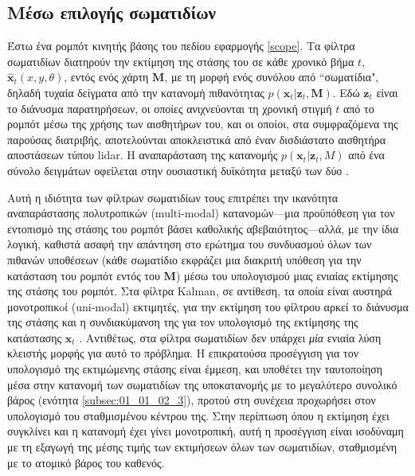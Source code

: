 \subsection{Μέσω επιλογής σωματιδίων}
\label{subsection:02_02_03:01}

Έστω ένα ρομπότ κινητής βάσης του πεδίου εφαρμογής \ref{scope}. Τα φίλτρα
σωματιδίων διατηρούν την εκτίμηση της στάσης του σε κάθε χρονικό βήμα
$t$, $\hat{\bm{x}}_t (x, y, \theta)$, εντός ενός χάρτη $\bm{M}$, με τη μορφή
ενός συνόλου από ``σωματίδια", δηλαδή τυχαία δείγματα από την κατανομή
πιθανότητας $p(\bm{x}_t | \bm{z}_t, \bm{M})$. Εδώ $\bm{z}_t$ είναι το διάνυσμα
παρατηρήσεων, οι οποίες ανιχνεύονται τη χρονική στιγμή $t$ από το ρομπότ μέσω
της χρήσης των αισθητήρων του, και οι οποίοι, στα συμφραζόμενα της παρούσας
διατριβής, αποτελούνται αποκλειστικά από έναν δισδιάστατο αισθητήρα αποστάσεων
τύπου lidar. H αναπαράσταση της κατανομής $p(\bm{x}_t | \bm{z}_t, M)$ από ένα
σύνολο δειγμάτων οφείλεται στην ουσιαστική δυϊκότητα μεταξύ των δύο
\cite{Smith1992}.

Αυτή η ιδιότητα των φίλτρων σωματιδίων τους επιτρέπει την ικανότητα
αναπαράστασης πολυτροπικών (multi-modal) κατανομών---μια προϋπόθεση για τον
εντοπισμό της στάσης του ρομπότ βάσει καθολικής αβεβαιότητος---αλλά, με την
ίδια λογική, καθιστά ασαφή την απάντηση στο ερώτημα του συνδυασμού όλων των
πιθανών υποθέσεων (κάθε σωματίδιο εκφράζει μια διακριτή υπόθεση για την
κατάσταση του ρομπότ εντός του $\bm{M}$) μέσω του υπολογισμού μιας ενιαίας
εκτίμησης της στάσης του ρομπότ. Στα φίλτρα Kalman, σε αντίθεση, τα οποία είναι
αυστηρά μονοτροπικoί (uni-modal) εκτιμητές, για την εκτίμηση του φίλτρου αρκεί
το διάνυσμα της στάσης και η συνδιακύμανση της για τον υπολογισμό της εκτίμησης
της κατάστασης $\bm{x}_t$ \cite{Maybeck1979}. Αντιθέτως, στα φίλτρα σωματιδίων
δεν υπάρχει \textit{μία} ενιαία λύση κλειστής μορφής για αυτό το πρόβλημα. Η
επικρατούσα προσέγγιση για τον υπολογισμό της εκτιμώμενης στάσης είναι έμμεση,
και υποθέτει την ταυτοποίηση μέσα στην κατανομή των σωματιδίων της υποκατανομής
με το μεγαλύτερο συνολικό βάρος (ενότητα \ref{subsec:01_01_02_3}), προτού στη
συνέχεια προχωρήσει στον υπολογισμό του σταθμισμένου κέντρου της. Στην
περίπτωση όπου η εκτίμηση έχει συγκλίνει και η κατανομή έχει γίνει μονοτροπική,
αυτή η προσέγγιση είναι ισοδύναμη με τη εξαγωγή της μέσης τιμής των εκτιμήσεων
όλων των σωματιδίων, σταθμισμένη με το ατομικό βάρος του καθενός.

